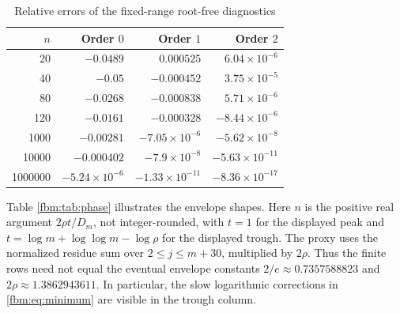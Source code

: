 \documentclass[11pt]{article}
\theoremstyle{remark}\newtheorem{remark}[theorem]{Remark}
\begin{document}
\begin{table}[htbp]\centering\small
\caption{Relative errors of the fixed-range root-free diagnostics}\label{fbm:tab:diagnostic}
\begin{tabular}{r r r r}\toprule
$n$ & Order $0$ & Order $1$ & Order $2$ \\\midrule
20 & $-0.0489$ & $0.000525$ & $6.04\times10^{-6}$\\
40 & $-0.05$ & $-0.000452$ & $3.75\times10^{-5}$\\
80 & $-0.0268$ & $-0.000838$ & $5.71\times10^{-6}$\\
120 & $-0.0161$ & $-0.000328$ & $-8.44\times10^{-6}$\\
1000 & $-0.00281$ & $-7.05\times10^{-6}$ & $-5.62\times10^{-8}$\\
10000 & $-0.000402$ & $-7.9\times10^{-8}$ & $-5.63\times10^{-11}$\\
1000000 & $-5.24\times10^{-6}$ & $-1.33\times10^{-11}$ & $-8.36\times10^{-17}$\\
\bottomrule\end{tabular}\end{table}

Table \ref{fbm:tab:phase} illustrates the envelope shapes. Here $n$ is the positive real argument $2\rho t/D_m$, not integer-rounded, with $t=1$ for the displayed peak and $t=\log m+\log\log m-\log\rho$ for the displayed trough. The proxy uses the normalized residue sum over $2\leq j\leq m+30$, multiplied by $2\rho$. Thus the finite rows need not equal the eventual envelope constants $2/e\approx0.7357588823$ and $2\rho\approx1.3862943611$. In particular, the slow logarithmic corrections in \eqref{fbm:eq:minimum} are visible in the trough column.
\end{document}
